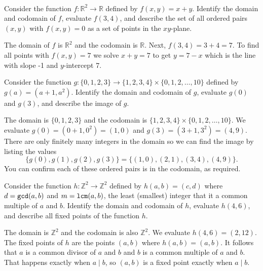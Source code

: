 \begin{exam}
~
    \begin{actpart}
        \item Consider the function $f: \mathbb{R}^2 \to \mathbb{R}$ defined by $f(x,y) = x+y$.  Identify the domain and codomain of $f$, evaluate $f(3,4)$, and describe the set of all ordered pairs $(x,y)$ with $f(x,y)=0$ as a set of points in the $xy$-plane.
            \begin{soln}
                The domain of $f$ is $\mathbb{R}^2$ and the codomain is $\mathbb{R}$. 
                Next, $f(3,4) = 3+4 = 7$.  To find all points with $f(x,y)=7$ we solve $x+y=7$ to get $y = 7-x$ which is the line with slope -1 and $y$-intercept 7.
                \end{soln}
        
        \item Consider the function $g: \{0,1,2,3\} \to \{1,2,3,4\} \times \{0,1,2,\ldots,10\}$ defined by $g(a) = (a+1,a^2)$.  Identify the domain and codomain of $g$, evaluate $g(0)$ and $g(3)$, and describe the image of $g$.
            \begin{soln}
                The domain is $\{0,1,2,3\}$ and the codomain is $\{1,2,3,4\} \times \{0,1,2,\ldots,10\}$.  We evaluate $g(0) = (0+1,0^2)=(1,0)$ and $g(3) = (3+1,3^2)=(4,9)$.  There are only finitely many integers in the domain so we can find the image by listing the values 
                    $$\{g(0), g(1), g(2), g(3) \} = \{ (1,0), (2,1), (3,4), (4,9)\}.$$
                You can confirm each of these ordered pairs is in the codomain, as required.
            \end{soln}
        \item Consider the function $h: \mathbb{Z}^2 \to \mathbb{Z}^2$ defined by $h(a,b) = (c,d)$ where $d=\texttt{gcd}(a,b)$ and $m =\texttt{lcm}(a,b)$, the least (smallest) integer that it a common multiple of $a$ and $b$.  Identify the domain and codomain of $h$, evaluate $h(4,6)$, and describe all fixed points of the function $h$.  
            \begin{soln}
                The domain is $\mathbb{Z}^2$ and the codomain is also $\mathbb{Z}^2$.  We evaluate $h(4,6)=(2,12)$. The fixed points of $h$ are the points $(a,b)$ where $h(a,b) = (a,b)$. It follows that $a$ is a common divisor of $a$ and $b$ and $b$ is a common multiple of $a$ and $b$.  That happens exactly when $a \mid b$, so $(a,b)$ is a fixed point exactly when $a \mid b$. 
            \end{soln}
    \end{actpart}
\end{exam}


